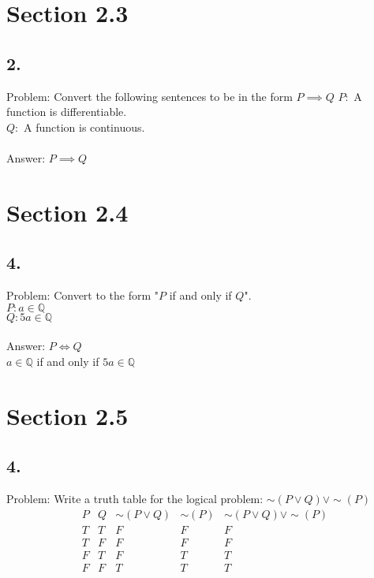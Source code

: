 \documentclass[12pt]{article}
\begin{document}
\hfill\vline\hfill
\begin{minipage}[t]{0.45\textwidth}
\section*{Section 2.3}
\subsection*{2.}
Problem: Convert the following sentences to be in the form $ P \implies Q $
$ P: $ A function is differentiable.\\
$ Q: $ A function is continuous.\\\\
Answer: $ P \implies Q $
\section*{Section 2.4}
\subsection*{4.}
Problem: Convert to the form "$ P $ if and only if $ Q $". \\
$ P: a \in \mathbb{Q}$\\
$ Q: 5a \in \mathbb{Q}$\\\\
Answer: $ P \Leftrightarrow Q $\\
$ a \in \mathbb{Q} $ if and only if $ 5a \in \mathbb{Q} $

\section*{Section 2.5}
\subsection*{4.}
Problem: Write a truth table for the logical problem: 
$ \sim (P \lor Q) \lor \sim(P) $\\
\[
\begin{array}{c|c|c|c|c}
P & Q &  \sim(P \lor Q) &  \sim(P)  & \sim(P \lor Q) \lor \sim(P)\\
\hline
T & T & F & F & F\\
T & F & F & F & F\\
F & T & F & T & T\\
F & F & T & T & T
\end{array}
\]


\end{minipage}
\pagebreak
\end{document}
